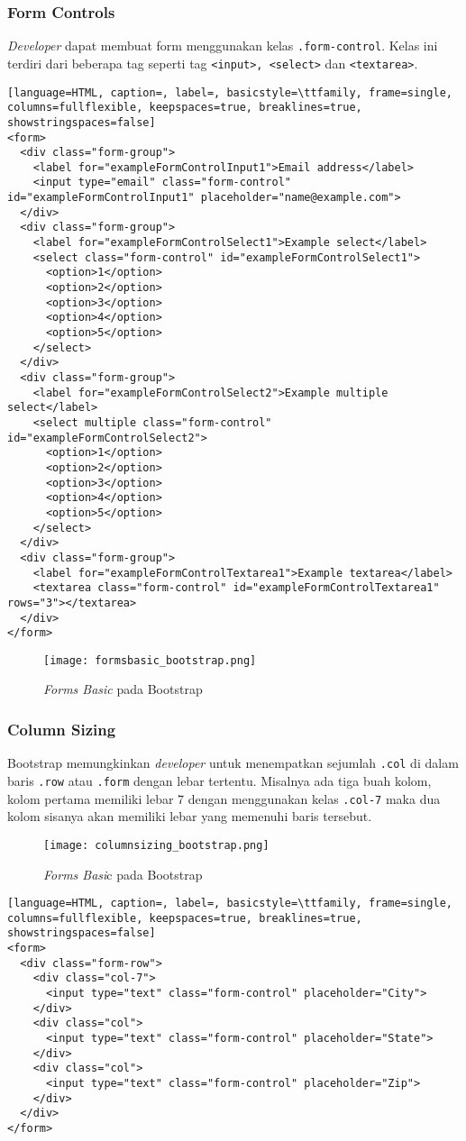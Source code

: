 \subsubsection{Form Controls}
\textit{Developer} dapat membuat form menggunakan kelas \texttt{.form-control}. Kelas ini terdiri dari beberapa tag seperti tag \texttt{<input>, <select>} dan \texttt{<textarea>}.
\begin{lstlisting}[language=HTML, caption=, label=, basicstyle=\ttfamily, frame=single, columns=fullflexible, keepspaces=true, breaklines=true, showstringspaces=false]  
<form>
  <div class="form-group">
    <label for="exampleFormControlInput1">Email address</label>
    <input type="email" class="form-control" id="exampleFormControlInput1" placeholder="name@example.com">
  </div>
  <div class="form-group">
    <label for="exampleFormControlSelect1">Example select</label>
    <select class="form-control" id="exampleFormControlSelect1">
      <option>1</option>
      <option>2</option>
      <option>3</option>
      <option>4</option>
      <option>5</option>
    </select>
  </div>
  <div class="form-group">
    <label for="exampleFormControlSelect2">Example multiple select</label>
    <select multiple class="form-control" id="exampleFormControlSelect2">
      <option>1</option>
      <option>2</option>
      <option>3</option>
      <option>4</option>
      <option>5</option>
    </select>
  </div>
  <div class="form-group">
    <label for="exampleFormControlTextarea1">Example textarea</label>
    <textarea class="form-control" id="exampleFormControlTextarea1" rows="3"></textarea>
  </div>
</form>
\end{lstlisting}

\begin{figure} [H]
	\centering  
	\texttt{[image: formsbasic\_bootstrap.png]}  
	\caption{\textit{Forms Basic} pada Bootstrap} 
\end{figure} 
\subsubsection{Column Sizing}
Bootstrap memungkinkan \textit{developer} untuk menempatkan sejumlah \texttt{.col} di dalam baris \texttt{.row} atau \texttt{.form} dengan lebar tertentu. Misalnya ada tiga buah kolom, kolom pertama memiliki lebar 7 dengan menggunakan kelas \texttt{.col-7} maka dua kolom sisanya akan memiliki lebar yang  memenuhi baris tersebut.
\begin{figure} [H]
	\centering  
	\texttt{[image: columnsizing\_bootstrap.png]}  
	\caption{\textit{Forms Basi}c pada Bootstrap} 
\end{figure} 
\begin{lstlisting}[language=HTML, caption=, label=, basicstyle=\ttfamily, frame=single, columns=fullflexible, keepspaces=true, breaklines=true, showstringspaces=false] 
<form>
  <div class="form-row">
    <div class="col-7">
      <input type="text" class="form-control" placeholder="City">
    </div>
    <div class="col">
      <input type="text" class="form-control" placeholder="State">
    </div>
    <div class="col">
      <input type="text" class="form-control" placeholder="Zip">
    </div>
  </div>
</form>
\end{lstlisting}
